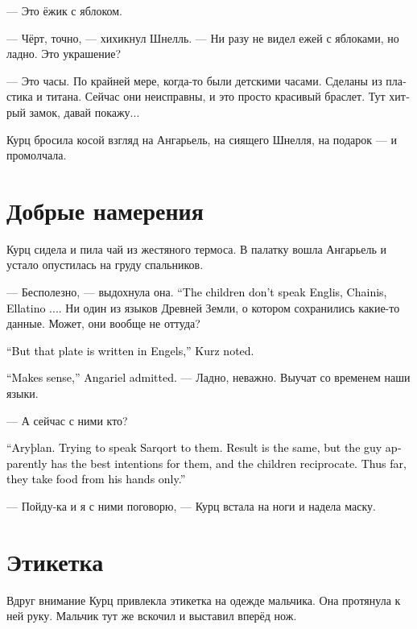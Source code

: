 \documentclass[a4paper,12pt,fleqn]{book}\usepackage{cooltooltips}\usepackage{polyglossia}\setdefaultlanguage[babelshorthands=true]{russian}\setotherlanguage{english}\defaultfontfeatures{Ligatures=TeX,Mapping=tex-text} \usepackage{xcolor}\definecolor{lightgray}{HTML}{bbbbbb}\color{lightgray}\newcommand{\ml}[3]{\textenglish{\textcolor{black}{#3}}}
\newcommand{\Arythlan}{Aryþlan}
\begin{document}
--- Это ёжик с яблоком.

--- Чёрт, точно, --- хихикнул Шнелль.
--- Ни разу не видел ежей с яблоками, но ладно.
Это украшение?

--- Это часы.
По крайней мере, когда-то были детскими часами.
Сделаны из пластика и титана.
Сейчас они неисправны, и это просто красивый браслет.
Тут хитрый замок, давай покажу...

Курц бросила косой взгляд на Ангарьель, на сиящего Шнелля, на подарок --- и промолчала.

\section{Добрые намерения}

Курц сидела и пила чай из жестяного термоса.
В палатку вошла Ангарьель и устало опустилась на груду спальников.

--- Бесполезно, --- выдохнула она.
\ml{$0$}
{--- Детишки не понимают англисский, чайнис, эллатино...}
{``The children don't speak Englis, Chainis, Ellatino ....}
Ни один из языков Древней Земли, о котором сохранились какие-то данные.
Может, они вообще не оттуда?

\ml{$0$}
{--- Но табличка-то на ангельском, --- заметила Курц.}
{``But that plate is written in Engels,'' Kurz noted.}

\ml{$0$}
{--- Разумно, --- признала Ангарьель.}
{``Makes sense,'' Angariel admitted.}
--- Ладно, неважно.
Выучат со временем наши языки.

--- А сейчас с ними кто?

\ml{$0$}
{--- Арслан.}
{``\Arythlan.}
\ml{$0$}
{Пытается разговаривать на саркорте.}
{Trying to speak Sarqort to them.}
\ml{$0$}
{Тоже безрезультатно, но у парня явно самые добрые намерения, и дети к нему тянутся.}
{Result is the same, but the guy apparently has the best intentions for them, and the children reciprocate.}
\ml{$0$}
{Едят пока что только из его рук.}
{Thus far, they take food from his hands only.''}

--- Пойду-ка и я с ними поговорю, --- Курц встала на ноги и надела маску.

\section{Этикетка}

Вдруг внимание Курц привлекла этикетка на одежде мальчика.
Она протянула к ней руку.
Мальчик тут же вскочил и выставил вперёд нож.
\end{document}
